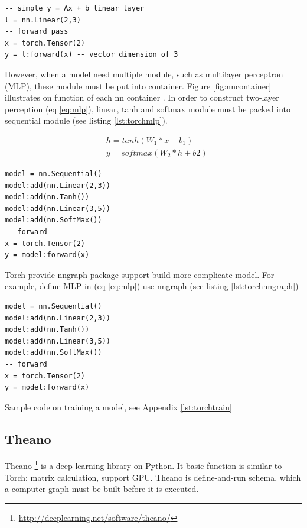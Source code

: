 \begin{lstlisting}[caption={Simple linear layer in Torch},label={lst:torchlinear}, language={[5.1]Lua}]
-- simple y = Ax + b linear layer
l = nn.Linear(2,3)
-- forward pass
x = torch.Tensor(2)
y = l:forward(x) -- vector dimension of 3
\end{lstlisting}

However, when a model need multiple module, such as multilayer perceptron (MLP), these module must be put into container. Figure \ref{fig:nncontainer} illustrates on function of each nn container . In order to construct two-layer perception (eq \ref{eq:mlp}), linear, tanh and softmax module must be packed into sequential module (see listing \ref{lst:torchmlp}).

\begin{equation}
\label{eq:mlp}
\begin{aligned}
&h = tanh(W_1*x + b_1) \\
&y = softmax(W_2*h + b2)
\end{aligned}
\end{equation}


\begin{lstlisting}[caption={MLP in Torch},label={lst:torchmlp}, language={[5.1]Lua}]
model = nn.Sequential()
model:add(nn.Linear(2,3))
model:add(nn.Tanh())
model:add(nn.Linear(3,5))
model:add(nn.SoftMax())
-- forward
x = torch.Tensor(2)
y = model:forward(x)
\end{lstlisting}

Torch provide nngraph package support build more complicate model. For example, define MLP in (eq \ref{eq:mlp}) use nngraph (see listing \ref{lst:torchnngraph})

\begin{lstlisting}[caption={MLP using nngraph},label={lst:torchnngraph}, language={[5.1]Lua}]
model = nn.Sequential()
model:add(nn.Linear(2,3))
model:add(nn.Tanh())
model:add(nn.Linear(3,5))
model:add(nn.SoftMax())
-- forward
x = torch.Tensor(2)
y = model:forward(x)
\end{lstlisting}

Sample code on training a model, see Appendix \ref{lst:torchtrain}

\subsection{Theano}
Theano \footnote{\url{http://deeplearning.net/software/theano/}} is a deep learning library on Python. It basic function is similar to Torch: matrix calculation, support GPU. Theano is define-and-run schema, which a computer graph must be built before it is executed.

